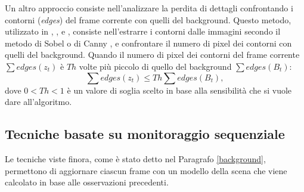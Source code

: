 Un altro approccio consiste nell'analizzare la perdita di dettagli confrontando i contorni (\textit{edges}) del frame corrente con quelli del background.
Questo metodo, utilizzato in \cite{ellwart2012camera}, \cite{gil2007automatic}, \cite{harasse2004automated} e \cite{kryjak2012fpga}, consiste nell'estrarre i contorni dalle immagini secondo il metodo di Sobel \cite{sobel19683x3} o di Canny \cite{canny1986computational}, e confrontare il numero di pixel dei contorni con quelli del background. 
Quando il numero di pixel dei contorni del frame corrente $\sum edges(z_t)$ \`e $Th$ volte pi\`u piccolo di quello del background $\sum edges(B_t)$:
\[ \sum edges(z_t) \leq Th \sum edges(B_t), \]
dove $0<Th<1$ \`e  un valore di soglia scelto in base alla sensibilit\`a che si vuole dare all'algoritmo.
\subsection{Tecniche basate su monitoraggio sequenziale}
Le tecniche viste finora, come \`e stato detto nel Paragrafo \ref{background}, permettono di aggiornare ciascun frame con un modello della scena che viene calcolato in base alle osservazioni precedenti.
